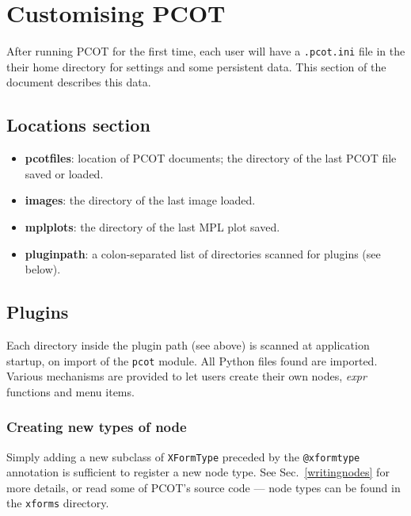 

\section{Customising PCOT}
\label{customisation}
After running PCOT for the first time, each user will have a
\texttt{.pcot.ini} file in the their home directory for settings
and some persistent data. This
section of the document describes this data.

\subsection{Locations section}
\begin{itemize}
\item \textbf{pcotfiles}: location of PCOT documents; the directory
of the last PCOT file saved or loaded.
\item \textbf{images}: the directory of the last image loaded.
\item \textbf{mplplots}: the directory of the last MPL plot saved.
\item \textbf{pluginpath}: a colon-separated list of directories
scanned for plugins (see below).
\end{itemize}

\subsection{Plugins}
Each directory inside the plugin path (see above) is scanned at
application startup, on import of the \texttt{pcot} module. All
Python files found are imported. Various mechanisms are provided
to let users create their own nodes, \emph{expr} functions and
menu items.

\subsubsection{Creating new types of node}
Simply adding a new subclass of \texttt{XFormType} preceded by
the \texttt{@xformtype} annotation is sufficient to register
a new node type. See Sec.~\ref{writingnodes} for more details,
or read some of PCOT's source code --- node types can be found
in the \texttt{xforms} directory.

